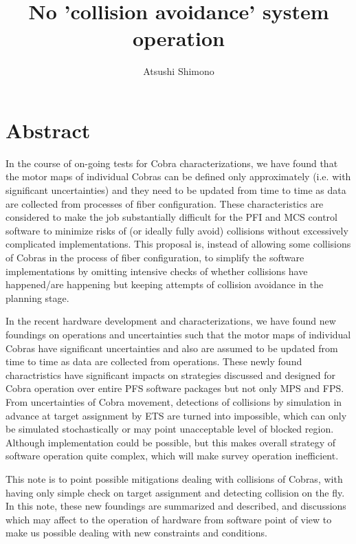 \documentclass[a4paper,notitlepage]{article}
\title{No 'collision avoidance' system operation}
\author{Atsushi Shimono}
\begin{document}
\drafttrue
{}
\SSNChangeRecord{
}

\ssnhead

\section{Abstract}

In the course of on-going tests for Cobra characterizations, we have found that the motor maps of individual Cobras can be defined only approximately (i.e. with significant uncertainties) and they need to be updated from time to time as data are collected from processes of fiber configuration. These characteristics are considered to make the job substantially difficult for the PFI and MCS control software to minimize risks of (or ideally fully avoid) collisions without excessively complicated implementations. This proposal is, instead of allowing some collisions of Cobras in the process of fiber configuration, to simplify the software implementations by omitting intensive checks of whether collisions have happened/are happening but keeping attempts of collision avoidance in the planning stage.

In the recent hardware development and characterizations, we have found 
new foundings on operations and uncertainties such that 
the motor maps of individual Cobras have significant uncertainties and 
also are assumed to be updated from time to time as data are collected from 
operations. 
These newly found charactristics have significant impacts on strategies 
discussed and designed for Cobra operation over entire PFS software packages 
but not only MPS and FPS. 
From uncertainties of Cobra movement, detections of collisions by simulation 
in advance at target assignment by ETS are turned into impossible, which 
can only be simulated stochastically or may point unacceptable level of 
blocked region. 
Although implementation could be possible, but this makes overall strategy 
of software operation quite complex, which will make survey operation 
inefficient. 

This note is to point possible mitigations dealing with collisions of 
Cobras, with having only simple check on target assignment and detecting 
collision on the fly. 
In this note, these new foundings are summarized and described, and 
discussions which may affect to the operation of hardware from software 
point of view to make us possible dealing with new constraints and conditions. 
\end{document}
